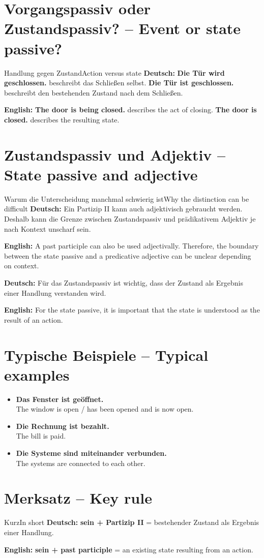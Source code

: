 \documentclass[a4paper,11pt]{article}
\newcommand{\GermanText}[1]{\textbf{Deutsch: }#1\par}
\newcommand{\EnglishText}[1]{{\small\color{SoftGray}\textbf{English: }#1\par}}
\newcommand{\ExampleItem}[2]{\item \textbf{#1}\\{\small\color{SoftGray}#2}}
\begin{document}
\section{Vorgangspassiv oder Zustandspassiv? -- Event or state passive?}
\begin{grammarentry}{Handlung gegen Zustand}{Action versus state}
\GermanText{\textbf{Die Tür wird geschlossen.} beschreibt das Schließen selbst. \textbf{Die Tür ist geschlossen.} beschreibt den bestehenden Zustand nach dem Schließen.}
\EnglishText{\textbf{The door is being closed.} describes the act of closing. \textbf{The door is closed.} describes the resulting state.}
\end{grammarentry}

\section{Zustandspassiv und Adjektiv -- State passive and adjective}
\begin{grammarentry}{Warum die Unterscheidung manchmal schwierig ist}{Why the distinction can be difficult}
\GermanText{Ein Partizip II kann auch adjektivisch gebraucht werden. Deshalb kann die Grenze zwischen Zustandspassiv und prädikativem Adjektiv je nach Kontext unscharf sein.}
\EnglishText{A past participle can also be used adjectivally. Therefore, the boundary between the state passive and a predicative adjective can be unclear depending on context.}
\GermanText{Für das Zustandspassiv ist wichtig, dass der Zustand als Ergebnis einer Handlung verstanden wird.}
\EnglishText{For the state passive, it is important that the state is understood as the result of an action.}
\end{grammarentry}

\section{Typische Beispiele -- Typical examples}
\begin{exbox}\begin{itemize}
\ExampleItem{Das Fenster ist geöffnet.}{The window is open / has been opened and is now open.}
\ExampleItem{Die Rechnung ist bezahlt.}{The bill is paid.}
\ExampleItem{Die Systeme sind miteinander verbunden.}{The systems are connected to each other.}
\end{itemize}\end{exbox}

\section{Merksatz -- Key rule}
\begin{grammarentry}{Kurz}{In short}
\GermanText{\textbf{sein + Partizip II} = bestehender Zustand als Ergebnis einer Handlung.}
\EnglishText{\textbf{sein + past participle} = an existing state resulting from an action.}
\end{grammarentry}
\end{document}
